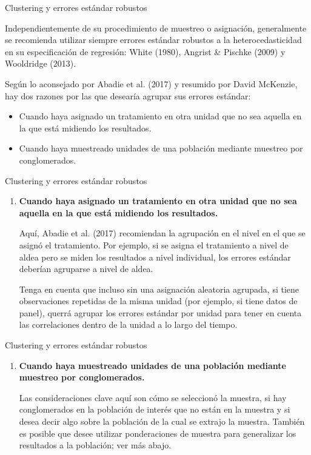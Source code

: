 \documentclass[11pt, aspectratio=169, compress]{beamer}
\newcommand\setItemnumber[1]{\setcounter{enumi}{\numexpr#1-1\relax}}
\begin{document}
\begin{frame}{Clustering y errores estándar robustos}

  Independientemente de su procedimiento de muestreo o asignación, generalmente se recomienda utilizar siempre errores estándar robustos a la heterocedasticidad en su especificación de regresión: White (1980), Angrist \& Pischke (2009) y Wooldridge (2013).

  Según lo aconsejado por Abadie et al. (2017) y resumido por David McKenzie, hay dos razones por las que desearía agrupar sus errores estándar:
  
  \begin{itemize}
    \item Cuando haya asignado un tratamiento en otra unidad que no sea aquella en la que está midiendo los resultados.
    \item Cuando haya muestreado unidades de una población mediante muestreo por conglomerados.
  \end{itemize}

\end{frame}
\begin{frame}{Clustering y errores estándar robustos}

  \begin{enumerate}
    \item \textbf{Cuando haya asignado un tratamiento en otra unidad que no sea aquella en la que está midiendo los resultados.}
    
    Aquí, Abadie et al. (2017) recomiendan la agrupación en el nivel en el que se asignó el tratamiento. Por ejemplo, si se asigna el tratamiento a nivel de aldea pero se miden los resultados a nivel individual, los errores estándar deberían agruparse a nivel de aldea. 
    
    Tenga en cuenta que incluso sin una asignación aleatoria agrupada, si tiene observaciones repetidas de la misma unidad (por ejemplo, si tiene datos de panel), querrá agrupar los errores estándar por unidad para tener en cuenta las correlaciones dentro de la unidad a lo largo del tiempo.
 
  \end{enumerate}
\end{frame}
\begin{frame}{Clustering y errores estándar robustos}

  \begin{enumerate}
    \setItemnumber{2}
    \item \textbf{Cuando haya muestreado unidades de una población mediante muestreo por conglomerados.}
    
    Las consideraciones clave aquí son cómo se seleccionó la muestra, si hay conglomerados en la población de interés que no están en la muestra y si desea decir algo sobre la población de la cual se extrajo la muestra. También es posible que desee utilizar ponderaciones de muestra para generalizar los resultados a la población; ver más abajo.
  \end{enumerate}
\end{frame}
\end{document}
